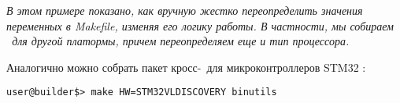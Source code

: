 \emph{В этом примере показано, как вручную жестко переопределить значения
переменных в Makefile, изменяя его логику работы. В частности, мы собираем
\ для другой платормы, причем переопределяем еще и тип
процессора.}


Аналогично можно собрать пакет кросс-\ для микроконтроллеров
STM32 :

\begin{lstlisting}[title=\cm{x}]
user@builder$> make HW=STM32VLDISCOVERY binutils
\end{lstlisting}




\secup
